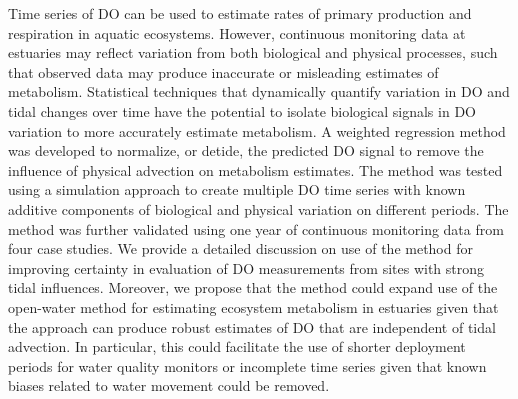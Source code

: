 Time series of \ac{DO} can be used to estimate rates of primary production and respiration in aquatic ecosystems.  However, continuous monitoring data at estuaries may reflect variation from both biological and physical processes, such that observed data may produce inaccurate or misleading estimates of metabolism.  Statistical techniques that dynamically quantify variation in \ac{DO} and tidal changes over time have the potential to isolate biological signals in \ac{DO} variation to more accurately estimate metabolism.  A weighted regression method was developed to normalize, or detide, the predicted \ac{DO} signal to remove the influence of physical advection on metabolism estimates.  The method was tested using a simulation approach to create multiple \ac{DO} time series with known additive components of biological and physical variation on different periods.  The method was further validated using one year of continuous monitoring data from four case studies. We provide a detailed discussion on use of the method for improving certainty in evaluation of \ac{DO} measurements from sites with strong tidal influences.  Moreover, we propose that the method could expand use of the open-water method for estimating ecosystem metabolism in estuaries given that the approach can produce robust estimates of \ac{DO} that are independent of tidal advection.  In particular, this could facilitate the use of shorter deployment periods for water quality monitors or incomplete time series given that known biases related to water movement could be removed. 